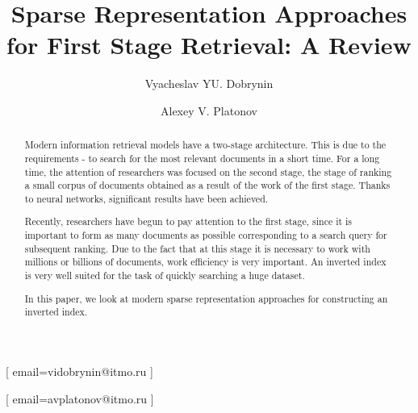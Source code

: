 \documentclass[
    twocolumn,
]{ceurart}
\begin{document}


    \title{Sparse Representation Approaches for First Stage Retrieval: A Review}

    \author[1]{Vyacheslav YU. Dobrynin}[%
        email=vidobrynin@itmo.ru
    ]

    \author[1]{Alexey V. Platonov}[%
        email=avplatonov@itmo.ru
    ]

    \address[1]{ITMO University, Kronverksky Pr. 49, bldg. A, Saint-Petersburg, 197101,
        Russian Federation}

    \begin{abstract}
        Modern information retrieval models have a two-stage architecture.
        This is due to the requirements - to search for the most relevant documents in a short time.
        For a long time, the attention of researchers was focused on the second stage, the stage
        of ranking a small corpus of documents obtained as a result of the work of the first stage.
        Thanks to neural networks, significant results have been achieved.

        Recently, researchers have begun to pay attention to the first stage, since it is important
        to form as many documents as possible corresponding to a search query for subsequent
        ranking.
        Due to the fact that at this stage it is necessary to work with millions or billions of
        documents, work efficiency is very important.
        An inverted index is very well suited for the task of quickly searching a huge dataset.

        In this paper, we look at modern sparse representation approaches for constructing an
        inverted index.
    \end{abstract}
\end{document}
